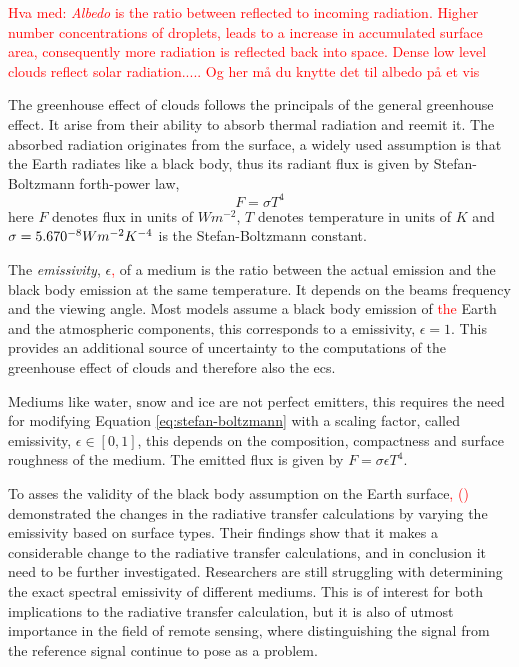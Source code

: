 \textcolor{red}{Hva med: \textit{Albedo} is the ratio between reflected to incoming radiation. Higher number concentrations of droplets, leads to a increase in accumulated surface area, consequently more radiation is reflected back into space. Dense low level clouds reflect solar radiation..... Og her må du knytte det til albedo på et vis}

The greenhouse effect of clouds follows the principals of the general greenhouse effect. It arise from their ability to absorb thermal radiation and reemit it. The absorbed radiation originates from the surface, a widely used assumption is that the Earth radiates like a black body, thus its radiant flux is given by Stefan-Boltzmann forth-power law, 
\begin{equation} \label{eq:stefan-boltzmann}
    F = \sigma  T ^4 %
\end{equation}
here $F$ denotes flux in units of $W m^{-2}$, $T$ denotes temperature in units of $K$ and \\  $\sigma = 5.670 \time 10^{-8} W m^{-2} K^{-4}$ is the Stefan-Boltzmann constant. 

The \textit{emissivity}, $\epsilon$\textcolor{red}{,} of a medium is the ratio between the actual emission and the black body emission at the same temperature. It depends on the beams frequency and the viewing angle. Most models assume a black body emission of \textcolor{red}{the} Earth and the atmospheric components, this corresponds to a emissivity, $\epsilon=1$. This provides an additional source of uncertainty to the computations of the greenhouse effect of clouds and therefore also the \acrshort{ecs}.

Mediums like water, snow and ice are not perfect emitters, this requires the need for modifying Equation \eqref{eq:stefan-boltzmann} with a scaling factor, called emissivity, $\epsilon \in [0, 1]$, this depends on the composition, compactness and surface roughness of the medium. The emitted flux is given by $ F = \sigma \epsilon T ^4$. 

    To asses the validity of the black body assumption on the Earth surface\textcolor{red}{,} \citeauthor{Huang2018ImprovedClimate} \textcolor{red}{(\citeyear{Huang2018ImprovedClimate})} demonstrated the changes in the radiative transfer calculations by varying the emissivity based on surface types. Their findings show that it makes a considerable change to the radiative transfer calculations, and in conclusion it need to be further investigated. Researchers are still struggling with determining the exact spectral emissivity of different mediums. This is of interest for both implications to the radiative transfer calculation, but it is also of utmost importance in the field of remote sensing, where distinguishing the signal from the reference signal continue to pose as a problem.

